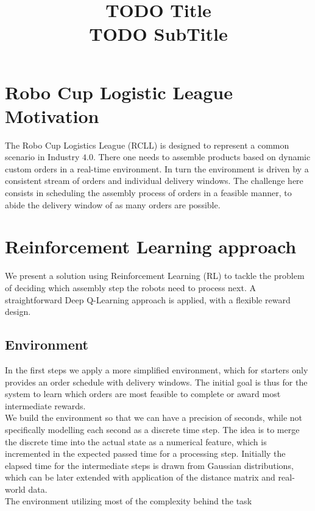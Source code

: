 \documentclass[runningheads,envcountsect]{llncs}
\title{{\huge TODO Title}\\{\LARGE \vspace{4pt} TODO SubTitle}}
\author{}
\institute{}
\begin{document}
\maketitle

\section{Robo Cup Logistic League Motivation}
The Robo Cup Logistics League (RCLL) is designed to represent a common scenario in Industry $4.0$. There one needs to assemble products based on dynamic custom orders in a real-time environment. In turn the environment is driven by a consistent stream of orders and individual delivery windows. The challenge here consists in scheduling the assembly process of orders in a feasible manner, to abide the delivery window of as many orders are possible.

\section{Reinforcement Learning approach}
We present a solution using Reinforcement Learning (RL) to tackle the problem of deciding which assembly step the robots need to process next. A straightforward Deep Q-Learning approach is applied, with a flexible reward design.


\subsection{Environment}
In the first steps we apply a more simplified environment, which for starters only provides an order schedule with delivery windows. The initial goal is thus for the system to learn which orders are most feasible to complete or award most intermediate rewards.\\
We build the environment so that we can have a precision of seconds, while not specifically modelling each second as a discrete time step. The idea is to merge the discrete time into the actual state as a numerical feature, which is incremented in the expected passed time for a processing step. Initially the elapsed time for the intermediate steps is drawn from Gaussian distributions, which can be later extended with application of the distance matrix and real-world data.\\
The environment utilizing most of the complexity behind the task 
\end{document}
